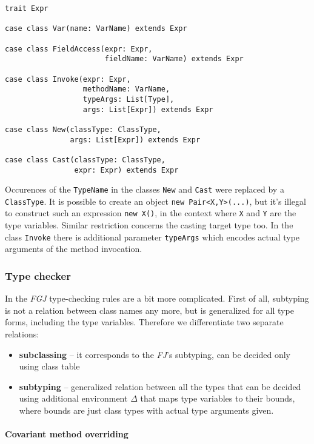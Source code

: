 \documentclass{article}[12pt]
\begin{document}
\begin{verbatim}
trait Expr

case class Var(name: VarName) extends Expr

case class FieldAccess(expr: Expr,
                       fieldName: VarName) extends Expr

case class Invoke(expr: Expr,
                  methodName: VarName,
                  typeArgs: List[Type],
                  args: List[Expr]) extends Expr

case class New(classType: ClassType,
               args: List[Expr]) extends Expr

case class Cast(classType: ClassType,
                expr: Expr) extends Expr
\end{verbatim}

Occurences of the \texttt{TypeName} in the classes \texttt{New}
and \texttt{Cast} were replaced by a \texttt{ClassType}. It is possible
to create an object \texttt{new Pair<X,Y>(...)}, but it's illegal
to construct such an expression \texttt{new X()}, in the context
where \texttt{X} and \texttt{Y} are the type variables. Similar
restriction concerns the casting target type too. In the class \texttt{Invoke} there is additional parameter \texttt{typeArgs}
which encodes actual type arguments of the method invocation.

\subsubsection{Type checker}

In the \emph{FGJ} type-checking rules are a bit more complicated.
First of all, subtyping is not a relation between class names any
more, but is generalized for all type forms, including the type
variables. Therefore we differentiate two separate relations:

\begin{itemize}
\item{\textbf{subclassing}} -- it corresponds to the \emph{FJ}'s
  subtyping, can be decided only using class table
\item{\textbf{subtyping}} -- generalized relation between all
  the types that can be decided using additional environment $\Delta$
  that maps type variables to their bounds, where bounds are
  just class types with actual type arguments given.
\end{itemize}

\paragraph{Covariant method overriding}
\end{document}
